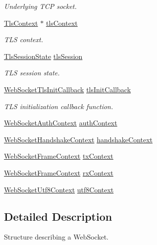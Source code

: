 \begin{DoxyCompactItemize}
\begin{DoxyCompactList}\small\item\em Underlying T\+CP socket. \end{DoxyCompactList}\item 
\hyperlink{tls_8h_ac09f7a286c0cdf9b07ee1edd107946f5}{Tls\+Context} $\ast$ \hyperlink{struct__WebSocket_aae1c65b4608ce3af80ba611c21f0b4bb}{tls\+Context}
\begin{DoxyCompactList}\small\item\em T\+LS context. \end{DoxyCompactList}\item 
\hyperlink{structTlsSessionState}{Tls\+Session\+State} \hyperlink{struct__WebSocket_aa72f13b6ae08ed38217d894ccb6ada6d}{tls\+Session}
\begin{DoxyCompactList}\small\item\em T\+LS session state. \end{DoxyCompactList}\item 
\hyperlink{web__socket_8h_ac1d28db340b5ef55a4a7e5e276018cf4}{Web\+Socket\+Tls\+Init\+Callback} \hyperlink{struct__WebSocket_a9f8b2ca6354bce4c6c5013ed6f5df2f8}{tls\+Init\+Callback}
\begin{DoxyCompactList}\small\item\em T\+LS initialization callback function. \end{DoxyCompactList}\item 
\hyperlink{structWebSocketAuthContext}{Web\+Socket\+Auth\+Context} \hyperlink{struct__WebSocket_acf5481349abb88e08d8dca45217e77a4}{auth\+Context}
\item 
\hyperlink{structWebSocketHandshakeContext}{Web\+Socket\+Handshake\+Context} \hyperlink{struct__WebSocket_afc4fa8b72b13673ce70cf3e5e403206d}{handshake\+Context}
\item 
\hyperlink{structWebSocketFrameContext}{Web\+Socket\+Frame\+Context} \hyperlink{struct__WebSocket_a3e4d7a24c5ad031f409427654f2cfe30}{tx\+Context}
\item 
\hyperlink{structWebSocketFrameContext}{Web\+Socket\+Frame\+Context} \hyperlink{struct__WebSocket_a78fece10de79b7449bc362195f10baeb}{rx\+Context}
\item 
\hyperlink{structWebSocketUtf8Context}{Web\+Socket\+Utf8\+Context} \hyperlink{struct__WebSocket_ab3dc10b5359080aa6ac0cfd66f5bec45}{utf8\+Context}
\end{DoxyCompactItemize}


\subsection{Detailed Description}
Structure describing a Web\+Socket. 

